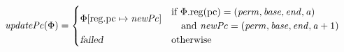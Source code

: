 \documentclass{article}
\newcommand{\update}[2]{[#1 \mapsto #2]}
\newcommand{\var}[1]{\mathit{#1}}
\newcommand{\pcreg}{\mathrm{pc}}
\newcommand{\addr}{\var{a}}
\newcommand{\start}{\var{base}}
\newcommand{\addrend}{\var{end}}
\newcommand{\perm}{\var{perm}}
\newcommand{\stdcap}[1][\perm]{\left(#1,\start,\addrend,\addr \right)}
\newcommand{\plainproj}[1]{\mathrm{#1}}
\newcommand{\memreg}[1][\Phi]{#1.\plainproj{reg}}
\newcommand{\updateReg}[3][\Phi]{#1\update{\plainproj{reg}.#2}{#3}}
\newcommand{\failed}{\textsl{failed}}
\newcommand{\plainfun}[2]{
  \ifthenelse{\equal{#2}{}}
             {\mathit{#1}}
             {\mathit{#1}(#2)}
}
\newcommand{\stdUpdatePc}[1]{\plainfun{updatePc}{#1}}
\begin{document}
\begin{align*}
  \stdUpdatePc{\Phi} &=
                       \begin{cases}
                         \updateReg{\pcreg}{\var{newPc}} & 
                           \arraycolsep=0pt
                           \begin{array}{l}
                             \text{if $\memreg(\pcreg) = \stdcap$}\\
                             \quad\text{and $\var{newPc} = (\perm,\start,\addrend,\addr + 1)$}\\
                           \end{array} \\
                           \failed & \text{otherwise}
                       \end{cases} \\
\end{align*}
\end{document}
